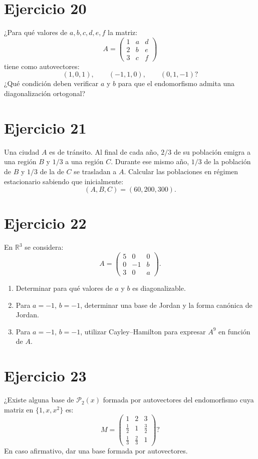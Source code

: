 \documentclass[11pt,a4paper]{article}
\newcommand{\R}{\mathbb{R}}
\begin{document}
\section{Ejercicio 20}
¿Para qué valores de $a,b,c,d,e,f$ la matriz:
\[
A=
\begin{pmatrix}
1&a&d\\
2&b&e\\
3&c&f
\end{pmatrix}
\]
tiene como autovectores:
\[
(1,0,1),\qquad(-1,1,0),\qquad(0,1,-1)?
\]
¿Qué condición deben verificar $a$ y $b$ para que el endomorfismo admita una diagonalización ortogonal?

\section{Ejercicio 21}
Una ciudad $A$ es de tránsito. Al final de cada año, $2/3$ de su población emigra a una región $B$ y $1/3$ a una región $C$. Durante ese mismo año, $1/3$ de la población de $B$ y $1/3$ de la de $C$ se trasladan a $A$. Calcular las poblaciones en régimen estacionario sabiendo que inicialmente:
\[
(A,B,C)=(60,200,300).
\]

\section{Ejercicio 22}
En $\R^3$ se considera:
\[
A=
\begin{pmatrix}
5&0&0\\
0&-1&b\\
3&0&a
\end{pmatrix}.
\]
\begin{enumerate}[label=\alph*)]
\item Determinar para qué valores de $a$ y $b$ es diagonalizable.
\item Para $a=-1$, $b=-1$, determinar una base de Jordan y la forma canónica de Jordan.
\item Para $a=-1$, $b=-1$, utilizar Cayley--Hamilton para expresar $A^9$ en función de $A$.
\end{enumerate}

\section{Ejercicio 23}
¿Existe alguna base de $\mathcal P_2(x)$ formada por autovectores del endomorfismo cuya matriz en $\{1,x,x^2\}$ es:
\[
M=
\begin{pmatrix}
1&2&3\\
\frac12&1&\frac32\\
\frac13&\frac23&1
\end{pmatrix}?
\]
En caso afirmativo, dar una base formada por autovectores.
\end{document}
